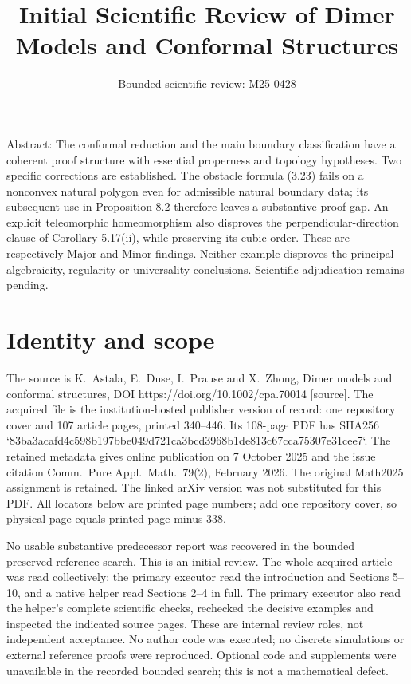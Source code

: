 \documentclass[10pt]{article}
\title{Initial Scientific Review of
Dimer Models and Conformal Structures}
\author{Bounded scientific review: M25-0428}
\date{}
\begin{document}
\maketitle
Abstract: The conformal reduction and the main boundary classification have a coherent proof structure with essential properness and topology hypotheses. Two specific corrections are established. The obstacle formula (3.23) fails on a nonconvex natural polygon even for admissible natural boundary data; its subsequent use in Proposition 8.2 therefore leaves a substantive proof gap. An explicit teleomorphic homeomorphism also disproves the perpendicular-direction clause of Corollary 5.17(ii), while preserving its cubic order. These are respectively Major and Minor findings. Neither example disproves the principal algebraicity, regularity or universality conclusions. Scientific adjudication remains pending.\par
\section*{Identity and scope}
The source is K. Astala, E. Duse, I. Prause and X. Zhong, Dimer models and conformal structures, DOI https://doi.org/10.1002/cpa.70014 [source]. The acquired file is the institution-hosted publisher version of record: one repository cover and 107 article pages, printed 340–446. Its 108-page PDF has SHA256 `83ba3acafd4c598b197bbe049d721ca3bcd3968b1de813c67cca75307e31cee7`. The retained metadata gives online publication on 7 October 2025 and the issue citation Comm. Pure Appl. Math. 79(2), February 2026. The original Math2025 assignment is retained. The linked arXiv version was not substituted for this PDF. All locators below are printed page numbers; add one repository cover, so physical page equals printed page minus 338.\par
No usable substantive predecessor report was recovered in the bounded preserved-reference search. This is an initial review. The whole acquired article was read collectively: the primary executor read the introduction and Sections 5–10, and a native helper read Sections 2–4 in full. The primary executor also read the helper’s complete scientific checks, rechecked the decisive examples and inspected the indicated source pages. These are internal review roles, not independent acceptance. No author code was executed; no discrete simulations or external reference proofs were reproduced. Optional code and supplements were unavailable in the recorded bounded search; this is not a mathematical defect.\par
\end{document}
